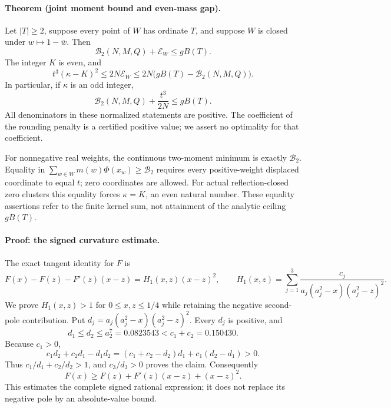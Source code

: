 \paragraph{Theorem (joint moment bound and even-mass gap).}
Let \(|T|\ge2\), suppose every point of \(W\) has ordinate \(T\),
and suppose \(W\) is closed under \(w\mapsto1-\overline w\).  Then
\begin{equation}\label{eq:moment-ratio-strong-bound}
 \mathcal B_2(N,M,Q)+\mathcal E_W\le gB(T).
\end{equation}
The integer \(K\) is even, and
\begin{equation}\label{eq:moment-ratio-lattice-cross}
 t^3(\kappa-K)^2\le2N\mathcal E_W
 \le2N\bigl(gB(T)-\mathcal B_2(N,M,Q)\bigr).
\end{equation}
In particular, if \(\kappa\) is an odd integer,
\begin{equation}\label{eq:moment-ratio-odd-gap}
 \mathcal B_2(N,M,Q)+\frac{t^3}{2N}\le gB(T).
\end{equation}
All denominators in these normalized statements are positive.
The coefficient of the rounding penalty is a certified positive value;
we assert no optimality for that coefficient.

For nonnegative real weights, the continuous two-moment minimum is
exactly \(\mathcal B_2\).  Equality in
\(\sum_{w\in W}m(w)\Phi(x_w)\ge\mathcal B_2\) requires every
positive-weight displaced coordinate to equal \(t\); zero coordinates
are allowed.  For actual reflection-closed zero clusters this equality
forces \(\kappa=K\), an even natural number.  These equality assertions
refer to the finite kernel sum, not attainment of the analytic ceiling
\(gB(T)\).

\paragraph{Proof: the signed curvature estimate.}
The exact tangent identity for \(F\) is
\[
 F(x)-F(z)-F'(z)(x-z)=H_1(x,z)(x-z)^2,\qquad
 H_1(x,z)=\sum_{j=1}^3
 \frac{c_j}{a_j(a_j^2-x)(a_j^2-z)^2}.
\]
We prove \(H_1(x,z)>1\) for \(0\le x,z\le1/4\) while retaining
the negative second-pole contribution.  Put
\(d_j=a_j(a_j^2-x)(a_j^2-z)^2\).
Every \(d_j\) is positive, and
\[
 d_1\le d_2\le a_2^7=0.0823543
 <c_1+c_2=0.150430.
\]
Because \(c_1>0\),
\[
 c_1d_2+c_2d_1-d_1d_2
 =(c_1+c_2-d_2)d_1+c_1(d_2-d_1)>0.
\]
Thus \(c_1/d_1+c_2/d_2>1\), and \(c_3/d_3>0\) proves the claim.
Consequently
\begin{equation}\label{eq:moment-ratio-strong-tangent}
 F(x)\ge F(z)+F'(z)(x-z)+(x-z)^2.
\end{equation}
This estimates the complete signed rational expression; it does not
replace its negative pole by an absolute-value bound.


